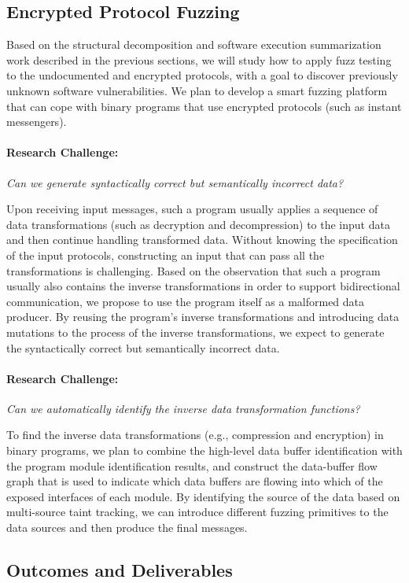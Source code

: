 \documentclass[letterpaper,twoside,11pt,headings=small]{scrartcl}
\newcommand{\challenge}[1]{\paragraph{Research Challenge:} \emph{#1}}
\begin{document}
\subsection{Encrypted Protocol Fuzzing}
\label{sec:overview:fuzzing}

Based on the structural decomposition and software execution summarization work
described in the previous sections, we will study how to apply fuzz testing to
the undocumented and encrypted protocols, with a goal to discover previously
unknown software vulnerabilities.  We plan to develop a smart fuzzing platform
that can cope with binary programs that use encrypted protocols (such as instant messengers).

\challenge{Can we generate syntactically correct but semantically incorrect data?}

Upon receiving input messages, such a program usually applies a sequence of data
transformations (such as decryption and decompression) to the input data and then
continue handling transformed data. Without knowing the specification of the input protocols,
constructing an input that can pass all the transformations is challenging.
Based on the observation that such a program usually also contains the inverse transformations
in order to support bidirectional communication, we propose to use the program
itself as a malformed data producer. By reusing the program's inverse transformations
and introducing data mutations to the process of the inverse transformations,
we expect to generate the syntactically correct but semantically incorrect data.

\challenge{Can we automatically identify the inverse data transformation functions?}

To find the inverse data transformations (e.g., compression and encryption) in binary programs,
we plan to combine the high-level data buffer identification with the program module identification results,
and construct the data-buffer flow graph that is used to indicate which data buffers are flowing into which of
the exposed interfaces of each module. By identifying the source of the data based on
multi-source taint tracking, we can introduce different fuzzing primitives to the data sources and then produce the final messages.

\subsection{Outcomes and Deliverables}
\label{sec:overview:outcomes}
\end{document}
